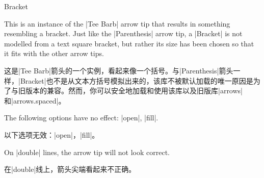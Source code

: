 \begin{arrowtip}{Bracket}{
    This is an instance of the |Tee Barb|  arrow tip that results in something
    resembling a bracket. Just like the |Parenthesis| arrow tip, a |Bracket| is
    not modelled from a text square bracket, but rather its size has been
    chosen so that it fits with the other arrow tips.

    这是|Tee Barb|箭头的一个实例，看起来像一个括号。与|Parenthesis|箭头一样，|Bracket|也不是从文本方括号模拟出来的，该库不被默认加载的唯一原因是为了与旧版本的\tikzname 兼容。然而，你可以安全地加载和使用该库以及旧版库|arrows|和|arrows.spaced|。


}%
{}%
{}

    \begin{arrowexamples}
        \arrowexample[]
        \arrowexampledup[sep]
        \arrowexampledupdot[sep]
        \arrowexample[reversed]
        \arrowexample[round]
        \arrowexample[slant=.3]
        \arrowexample[left]
        \arrowexample[right]
        \arrowexample[red]
    \end{arrowexamples}
    The following options have no effect: |open|, |fill|.

    以下选项无效：|open|，|fill|。



    On |double| lines, the arrow tip will not look correct.

    在|double|线上，箭头尖端看起来不正确。


\end{arrowtip}

